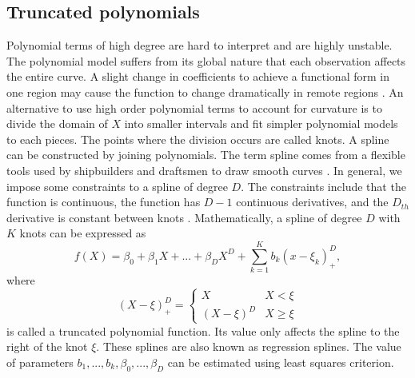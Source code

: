 \documentclass{article}
\begin{document}
\subsection{Truncated polynomials}
Polynomial terms of high degree are hard to interpret and are highly unstable. The polynomial model suffers from its global nature that each observation affects the entire curve. A slight change in coefficients to achieve a functional form in one region may cause the function to change dramatically in remote regions \cite{friedman2001elements}. 
An alternative to use high order polynomial terms to account for curvature is to divide the domain of $X$ into smaller intervals and fit simpler polynomial models to each pieces. The points where the division occurs are called knots. A spline can be constructed by joining polynomials. The term spline comes from a flexible tools used by shipbuilders and draftsmen to draw smooth curves \cite{wegman1983splines}. In general, we impose some constraints to a spline of degree $D$. The constraints include that the function is continuous, the function has $D-1$ continuous derivatives, and the $D_{th}$ derivative is constant between knots \cite{friedman2001elements}. Mathematically, a spline of degree $D$ with $K$ knots can be expressed as
\begin{equation}
f(X)=\beta_0+\beta_1X+...+\beta_DX^D+\sum_{k=1}^{K}b_k(x-\xi_k)_+^D,
\end{equation}
where 
\begin{equation}
(X-\xi)_+^D=
\begin{cases}
X& X<\xi\\
(X-\xi)^D& X \ge \xi
\end{cases}
\end{equation}
is called a truncated polynomial function. Its value only affects the spline to the right of the knot $\xi$. These splines are also known as regression splines. The value of parameters $b_1,...,b_k,\beta_0,...,\beta_D$ can be estimated using least squares criterion. 
\end{document}
